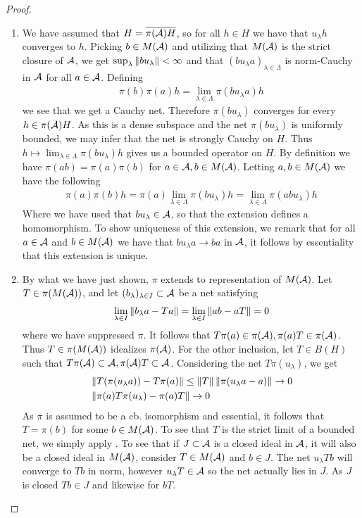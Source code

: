 \begin{proof}
	\begin{enumerate}
	\item
		We have assumed that $H=\overline{\pi(\mathcal{A})H}$, so for all $h\in H$ we have that $u_\lambda h$ converges to $h$. Picking $b\in M(\mathcal{A})$ and utilizing that $M(\mathcal{A})$ is the strict closure of $\mathcal{A}$, we get $\sup_{\lambda}\left \Vert bu_\lambda \right \Vert<\infty$ and that $(bu_\lambda a)_{\lambda\in \Lambda}$ is norm-Cauchy in $\mathcal{A}$ for all $a\in \mathcal{A}$. Defining 
		\begin{align*}
			\pi(b)\pi(a)h=\lim_{\lambda \in \Lambda} \pi(bu_\lambda a)h
		\end{align*}
		we see that we get a Cauchy net. Therefore $\pi(bu_\lambda)$ converges for every $h\in \pi(\mathcal{A})H$. As this is a dense subspace and the net $\pi(bu_\lambda )$ is uniformly bounded, we may infer that the net is strongly Cauchy on $H$. Thus $h\mapsto \lim_{\lambda \in \Lambda} \pi(bu_\lambda)h$ gives us a bounded operator on $H$. 
		By definition we have $\pi(ab)=\pi(a)\pi(b)$ for $a\in \mathcal{A},b\in M(\mathcal{A})$. Letting $a,b\in M(\mathcal{A})$ we have the following
		\begin{align*}
			\pi(a)\pi(b)h=\pi(a)\lim_{\lambda \in \Lambda}\pi(bu_\lambda)h=\lim_{\lambda\in \Lambda} \pi(abu_\lambda)h
		\end{align*}
		Where we have used that $bu_\lambda \in \mathcal{A}$, so that the extension defines a homomorphism. 
		To show uniqueness of this extension, we remark that for all $a\in \mathcal{A}$ and $b\in M(\mathcal{A})$ we have that $bu_\lambda a\to ba$ in $\mathcal{A}$, it follows by essentiality that this extension is unique. 
	\item
		By what we have just shown, $\pi$ extends to representation of $M(\mathcal{A})$. Let $T\in \pi(M(\mathcal{A}))$, and let $(b_\lambda)_{\lambda \in I}\subset \mathcal{A}$ be a net satisfying 
		\begin{align*}
			\lim_{\lambda \in I}\left \Vert b_\lambda a-Ta \right \Vert=\lim_{\lambda \in I}\left \Vert ab-aT \right \Vert=0
		\end{align*}
		where we have suppressed $\pi$. It follows that $T\pi(a)\in \pi(\mathcal{A}),\pi(a)T\in \pi(\mathcal{A})$. Thus $T\in \pi(M(\mathcal{A}))$ idealizes $\pi(\mathcal{A})$. For the other inclusion, let $T\in B(H)$ such that $T\pi(\mathcal{A})\subset \mathcal{A},\pi(\mathcal{A})T\subset \mathcal{A}$. Considering the net $T\pi(u_\lambda)$, we get 
		\begin{align*}
			&\left \Vert T(\pi(u_\lambda a))-T\pi(a) \right \Vert\leq \left \Vert T \right \Vert\left \Vert \pi(u_\lambda a-a) \right \Vert\to 0 \\
			&\left \Vert \pi(a)T\pi(u_\lambda)-\pi(a)T \right \Vert\to 0
		\end{align*}
		As $\pi$ is assumed to be a cb. isomorphism and essential, it follows that $T=\pi(b)$ for some $b\in M(\mathcal{A})$. To see that $T$ is the strict limit of a bounded net, we simply apply . To see that if $J\subset \mathcal{A}$ is a closed ideal in $\mathcal{A}$, it will also be a closed ideal in $M(\mathcal{A})$, consider $T\in  M(\mathcal{A})$ and $b\in J$. The net $u_\lambda Tb$ will converge to $Tb$ in norm, however $u_\lambda T\in \mathcal{A}$ so the net actually lies in $J$. As $J$ is closed $Tb\in J$ and likewise for $bT$. 

\end{enumerate}
\end{proof}
